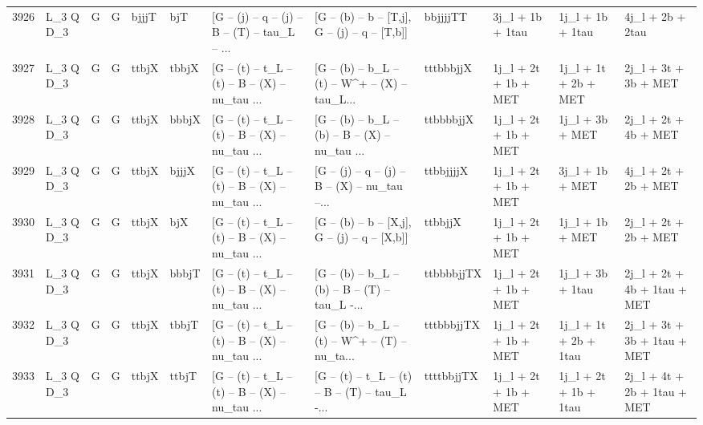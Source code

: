 \begin{tabular}{llllllllllll}
3926 &    L\_3 Q D\_3 &     G &     G &       bjjjT &         bjT &  [G -- (j) -- q -- (j) -- B -- (T) -- tau\_L -- ... &   [G -- (b) -- b -- [T,j], G -- (j) -- q -- [T,b]] &    bbjjjjTT &         3j\_l + 1b + 1tau &         1j\_l + 1b + 1tau &                   4j\_l + 2b + 2tau \\
3927 &    L\_3 Q D\_3 &     G &     G &       ttbjX &       tbbjX &  [G -- (t) -- t\_L -- (t) -- B -- (X) -- nu\_tau ... &  [G -- (b) -- b\_L -- (t) -- W\textasciicircum + -- (X) -- tau\_L... &   tttbbbjjX &     1j\_l + 2t + 1b + MET &     1j\_l + 1t + 2b + MET &               2j\_l + 3t + 3b + MET \\
3928 &    L\_3 Q D\_3 &     G &     G &       ttbjX &       bbbjX &  [G -- (t) -- t\_L -- (t) -- B -- (X) -- nu\_tau ... &  [G -- (b) -- b\_L -- (b) -- B -- (X) -- nu\_tau ... &   ttbbbbjjX &     1j\_l + 2t + 1b + MET &          1j\_l + 3b + MET &               2j\_l + 2t + 4b + MET \\
3929 &    L\_3 Q D\_3 &     G &     G &       ttbjX &       bjjjX &  [G -- (t) -- t\_L -- (t) -- B -- (X) -- nu\_tau ... &  [G -- (j) -- q -- (j) -- B -- (X) -- nu\_tau --... &   ttbbjjjjX &     1j\_l + 2t + 1b + MET &          3j\_l + 1b + MET &               4j\_l + 2t + 2b + MET \\
3930 &    L\_3 Q D\_3 &     G &     G &       ttbjX &         bjX &  [G -- (t) -- t\_L -- (t) -- B -- (X) -- nu\_tau ... &   [G -- (b) -- b -- [X,j], G -- (j) -- q -- [X,b]] &     ttbbjjX &     1j\_l + 2t + 1b + MET &          1j\_l + 1b + MET &               2j\_l + 2t + 2b + MET \\
3931 &    L\_3 Q D\_3 &     G &     G &       ttbjX &       bbbjT &  [G -- (t) -- t\_L -- (t) -- B -- (X) -- nu\_tau ... &  [G -- (b) -- b\_L -- (b) -- B -- (T) -- tau\_L -... &  ttbbbbjjTX &     1j\_l + 2t + 1b + MET &         1j\_l + 3b + 1tau &        2j\_l + 2t + 4b + 1tau + MET \\
3932 &    L\_3 Q D\_3 &     G &     G &       ttbjX &       tbbjT &  [G -- (t) -- t\_L -- (t) -- B -- (X) -- nu\_tau ... &  [G -- (b) -- b\_L -- (t) -- W\textasciicircum + -- (T) -- nu\_ta... &  tttbbbjjTX &     1j\_l + 2t + 1b + MET &    1j\_l + 1t + 2b + 1tau &        2j\_l + 3t + 3b + 1tau + MET \\
3933 &    L\_3 Q D\_3 &     G &     G &       ttbjX &       ttbjT &  [G -- (t) -- t\_L -- (t) -- B -- (X) -- nu\_tau ... &  [G -- (t) -- t\_L -- (t) -- B -- (T) -- tau\_L -... &  ttttbbjjTX &     1j\_l + 2t + 1b + MET &    1j\_l + 2t + 1b + 1tau &        2j\_l + 4t + 2b + 1tau + MET \\

\end{tabular}

